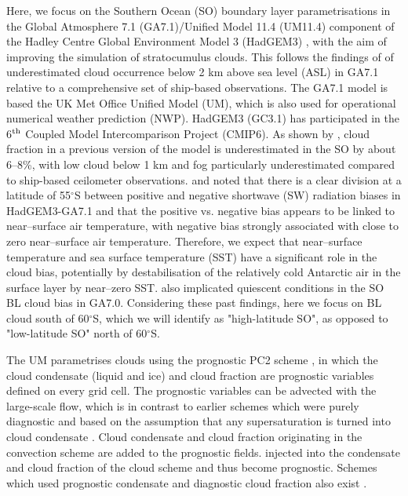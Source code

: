 Here, we focus on the Southern Ocean (SO) boundary layer parametrisations in the
Global Atmosphere 7.1 (GA7.1)/Unified Model 11.4 (UM11.4) component of the
Hadley Centre Global Environment Model 3 (HadGEM3) \citep{walters2019},
with the aim of improving the simulation of stratocumulus clouds.
This follows the findings of \cite{kuma2020a} of underestimated cloud occurrence
below 2 km above sea level (ASL) in GA7.1 relative to a comprehensive set of
ship-based observations.
The GA7.1 model is based the  UK Met Office
Unified Model (UM), which is also used for operational numerical weather
prediction (NWP). HadGEM3 (GC3.1) has participated in the 6$^{\rm th}$ Coupled
Model Intercomparison Project (CMIP6). As shown by \cite{kuma2020a}, cloud
fraction in a previous version of the model is underestimated in the SO by about 6--8\%, with low cloud below 1 km
and fog particularly underestimated compared to ship-based ceilometer
observations. \cite{schuddeboom2019} and \cite{kuma2020a} noted that there is a clear division at a latitude of 55$^\circ$S between positive and negative shortwave (SW) radiation biases in HadGEM3-GA7.1 and that the positive vs. negative bias appears to be linked to near--surface air temperature, with negative bias strongly associated with
close to zero near--surface air temperature. Therefore, we expect that
near--surface temperature and sea surface temperature (SST) have a significant role in the cloud bias, potentially by destabilisation of the relatively cold Antarctic air in the surface
layer by near--zero SST. \cite{loveridge2019} also implicated quiescent conditions in the
SO BL cloud bias in GA7.0. Considering these past findings, here we focus
on BL cloud south of 60$^\circ$S, which we will identify as
"high-latitude SO", as opposed to "low-latitude SO" north of 60$^\circ$S.

The UM parametrises clouds using the prognostic PC2 scheme
\citep{wilson2008a,wilson2008b}, in which the cloud condensate (liquid and ice)
and cloud fraction are prognostic variables defined on every grid cell. The prognostic variables can be advected with the
large-scale flow, which is in contrast to earlier schemes which were purely
diagnostic \citep{smith1990} and based on the assumption that any
supersaturation is turned into cloud condensate \citep{jakob2000}. Cloud
condensate and cloud fraction originating in the convection scheme are
added to the prognostic fields.
injected
into the condensate and cloud fraction of the cloud scheme and thus become
prognostic.
Schemes which
used prognostic condensate and diagnostic cloud fraction also exist
\citep{sundqvist1978,sundqvist1989}.

